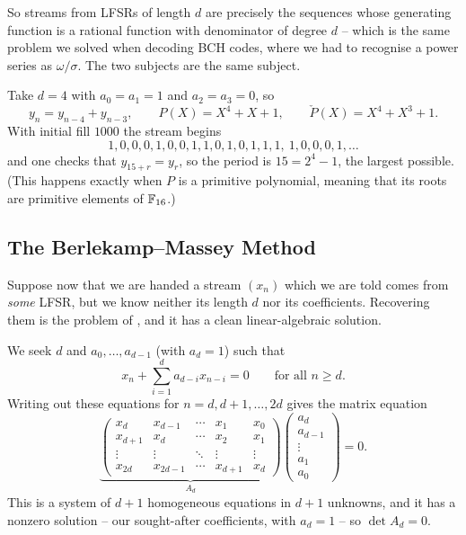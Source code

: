 \documentclass[a4paper]{scrartcl}
\begin{document}
So streams from LFSRs of length $d$ are precisely the sequences whose generating function is a rational function with denominator of degree $d$ -- which is the same problem we solved when decoding BCH codes, where we had to recognise a power series as $\omega/\sigma$. The two subjects are the same subject.

\begin{example}\label{ex:lfsr}
	Take $d = 4$ with $a_0 = a_1 = 1$ and $a_2=a_3=0$, so
	$$y_n = y_{n-4}+y_{n-3}, \qquad P(X) = X^4+X+1, \qquad \check P(X) = X^4+X^3+1.$$
	With initial fill $1000$ the stream begins
	$$1,0,0,0,1,0,0,1,1,0,1,0,1,1,1,\ 1,0,0,0,1,\dots$$
	and one checks that $y_{15+r} = y_r$, so the period is $15 = 2^4-1$, the largest possible. (This happens exactly when $P$ is a primitive polynomial, meaning that its roots are primitive elements of $\mathbb{F}_{16}$.)
\end{example}

\subsection{The Berlekamp--Massey Method}

Suppose now that we are handed a stream $(x_n)$ which we are told comes from \emph{some} LFSR, but we know neither its length $d$ nor its coefficients. Recovering them is the problem of , and it has a clean linear-algebraic solution.

We seek $d$ and $a_0,\dots,a_{d-1}$ (with $a_d = 1$) such that
$$x_n + \sum_{i=1}^{d}a_{d-i}x_{n-i} = 0 \qquad \text{for all } n \ge d.$$
Writing out these equations for $n = d, d+1, \dots, 2d$ gives the matrix equation
$$\underbrace{\begin{pmatrix}
	x_d & x_{d-1} & \cdots & x_1 & x_0\\
	x_{d+1} & x_d & \cdots & x_2 & x_1\\
	\vdots & \vdots & \ddots & \vdots & \vdots\\
	x_{2d} & x_{2d-1} & \cdots & x_{d+1} & x_d
\end{pmatrix}}_{A_d}
\begin{pmatrix} a_d\\ a_{d-1}\\ \vdots \\ a_1 \\ a_0\end{pmatrix} = 0.$$
This is a system of $d+1$ homogeneous equations in $d+1$ unknowns, and it has a nonzero solution -- our sought-after coefficients, with $a_d = 1$ -- so $\det A_d = 0$.
\end{document}
